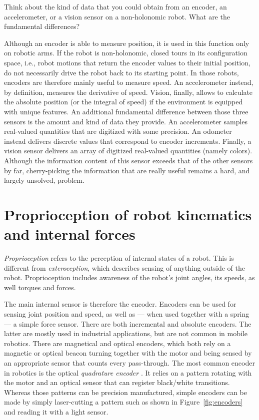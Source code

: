 \begin{framed}
Think about the kind of data that you could obtain from an encoder, an accelerometer, or a vision sensor on a non-holonomic robot. What are the fundamental differences?
\end{framed}
Although an encoder is able to measure position, it is used in this function only on robotic arms. If the robot is non-holonomic, closed tours in its configuration space, i.e., robot motions that return the encoder values to their initial position, do not necessarily drive the robot back to its starting point. In those robots, encoders are therefore mainly useful to measure speed. An accelerometer instead, by definition, measures the derivative of speed. Vision, finally, allows to calculate the absolute position (or the integral of speed) if the environment is equipped with unique features. An additional fundamental difference between those three sensors is the amount and kind of data they provide. An accelerometer samples real-valued quantities that are digitized with some precision. An odometer instead delivers discrete values that correspond to encoder increments. Finally, a vision sensor delivers an array of digitized real-valued quantities (namely colors). Although the information content of this sensor exceeds that of the other sensors by far, cherry-picking the information that are really useful remains a hard, and largely unsolved, problem.


\section{Proprioception of robot kinematics and internal forces}
\emph{Proprioception}  refers to the perception of internal states of a robot.
This is different from \emph{exteroception}, which describes sensing of anything outside of the robot. Proprioception includes awareness of the robot's joint angles, its speeds, as well torques and forces.

The main internal sensor is therefore the encoder. Encoders can be used for sensing joint position and speed, as well as --- when used together with a spring --- a simple force sensor. There are both incremental and absolute encoders. The latter are mostly used in industrial applications, but are not common in mobile robotics. There are magnetical and optical encoders, which both rely on a magnetic or optical beacon turning together with the motor and being sensed by an appropriate sensor that counts every pass-through. The most common encoder in robotics is the optical \emph{quadrature encoder} . It relies on a pattern rotating with the motor and an optical sensor that can register black/white transitions. Whereas those patterns can be precision manufactured, simple encoders can be made by simply laser-cutting a pattern such as shown in Figure~\ref{fig:encoders} and reading it with a light sensor.

